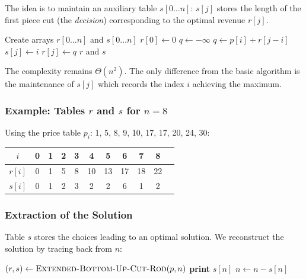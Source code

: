 The idea is to maintain an auxiliary table $s[0\ldots n]$: $s[j]$ stores the length
of the first piece cut (the \emph{decision}) corresponding to the optimal revenue $r[j]$.

\begin{algorithm}[H]
\caption{Extended-Bottom-Up-Cut-Rod($p$, $n$)}
\begin{algorithmic}[1]
\State Create arrays $r[0\ldots n]$ and $s[0\ldots n]$
\State $r[0] \leftarrow 0$
    \State $q \leftarrow -\infty$
            \State $q \leftarrow p[i] + r[j - i]$  
            \State $s[j] \leftarrow i$              
        \EndIf
    \EndFor
    \State $r[j] \leftarrow q$
\EndFor
\State \Return $r$ and $s$
\end{algorithmic}
\end{algorithm}

The complexity remains $\Theta(n^2)$. The only difference from the basic algorithm
is the maintenance of $s[j]$ which records the index $i$ achieving the maximum.

\subsubsection{Example: Tables $r$ and $s$ for $n = 8$}

Using the price table $p_i$: 1, 5, 8, 9, 10, 17, 17, 20, 24, 30:

\begin{center}
\renewcommand{\arraystretch}{1.3}
\begin{tabular}{ccccccccccc}
\toprule
$i$    & 0 & 1 & 2 & 3 & 4  & 5  & 6  & 7  & 8  \\
\midrule
$r[i]$ & 0 & 1 & 5 & 8 & 10 & 13 & 17 & 18 & 22 \\
$s[i]$ & 0 & 1 & 2 & 3 & 2  & 2  & 6  & 1  & 2  \\
\bottomrule
\end{tabular}
\end{center}

\subsubsection{Extraction of the Solution}

Table $s$ stores the choices leading to an optimal solution.
We reconstruct the solution by tracing back from $n$:

\begin{algorithm}[H]
\caption{Print-Cut-Rod-Solution($p$, $n$)}
\begin{algorithmic}[1]
\State $(r, s) \leftarrow \textsc{Extended-Bottom-Up-Cut-Rod}(p, n)$
    \State \textbf{print} $s[n]$   
    \State $n \leftarrow n - s[n]$
\EndWhile
\end{algorithmic}
\end{algorithm}

